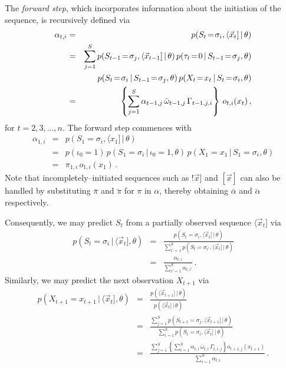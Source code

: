 \documentclass[a4paper]{article}
\begin{document}
The {\em forward step}, which incorporates information about the initiation of the sequence, is recursively defined via
\begin{eqnarray}
   \alpha_{t,i} & = & p(S_t\!=\!\sigma_i,\langle\vec{x}_t]\,|\,\theta)
\nonumber\\& = &
   \sum_{j=1}^{S}p(S_{t-1}\!=\!\sigma_j,\langle\vec{x}_{t-1}]\,|\,\theta)
      \,p(\tau_t\!=\!0\,|\,S_{t-1}\!=\!\sigma_j,\theta)
\nonumber\\&&
    \hspace*{5mm}\,p(S_t\!=\!\sigma_i\,|\,S_{t-1}\!=\!\sigma_j,\theta)\,p(X_t\!=\!x_t\,|\,S_t\!=\!\sigma_i,\theta)
\nonumber\\& = &
   \left\{\sum_{j=1}^{S}\alpha_{t-1,j}\,\bar{\omega}_{t-1,j}\,\Gamma_{t-1,j,i}\right\}\,o_{t,i}(x_t)\,,
\end{eqnarray}
for $t=2,3,\ldots,n$. The forward step commences with
\begin{eqnarray}
  \alpha_{1,i} & = & p(S_1\!=\!\sigma_i,\langle x_1]\,|\,\theta)
\nonumber\\& = & 
  p(\iota_0\!=\!1)\,p(S_1\!=\!\sigma_i\,|\,\iota_0\!=\!1,\theta)\,p(X_1\!=\!x_1\,|\,S_1\!=\!\sigma_i,\theta)
\nonumber\\& = & 
  \pi_{1,i}\,o_{1,i}(x_1)
\,.
\end{eqnarray}
Note that incompletely--initiated sequences such as $!\vec{x}]$ and $[\vec{x}]$ can also be handled by substituting $\bar{\pi}$ and $\breve{\pi}$ for $\pi$ in $\alpha$, thereby obtaining
$\bar{\alpha}$ and $\breve{\alpha}$ respectively.

Consequently, we may predict $S_t$ from a partially observed sequence $\langle\vec{x}_t]$ via
\begin{eqnarray}
  p(S_t\!=\!\sigma_i\,|\,\langle\vec{x}_t],\theta) & = & 
  \frac{p(S_t\!=\!\sigma_i,\langle\vec{x}_t]\,|\,\theta)}
       {\sum_{i'=1}^{S}p(S_t\!=\!\sigma_{i'},\langle\vec{x}_t]\,|\,\theta)}
\nonumber\\& = & 
  \frac{\alpha_{t,i}}{\sum_{i'=1}^{S}\alpha_{t,i'}}\,.
\end{eqnarray}
Similarly, we may predict the next observation $X_{t+1}$ via
\begin{eqnarray}
  p(X_{t+1}\!=\!x_{t+1}\,|\,\langle\vec{x}_t],\theta) 
& = &
  \frac{p(\langle\vec{x}_{t+1}]\,|\,\theta)}
       {p(\langle\vec{x}_{t}]\,|\,\theta)}
\nonumber\\& = & 
  \frac{\sum_{j=1}^S p(S_{t+1}\!=\!\sigma_j,\langle\vec{x}_{t+1}]\,|\,\theta)}
       {\sum_{i=1}^S p(S_{t}\!=\!\sigma_i,\langle\vec{x}_{t}]\,|\,\theta)}
\nonumber\\& = & 
  \frac{\sum_{j=1}^S\left\{\sum_{i=1}^S\alpha_{t,i}\,\bar{\omega}_{t,i}\,\Gamma_{t,i,j}\right\}o_{t+1,j}(x_{t+1})}
       {\sum_{i=1}^S\alpha_{t,i}}
\,.
\end{eqnarray}
\end{document}
